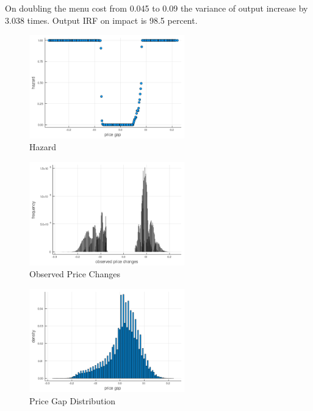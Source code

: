 On doubling the menu cost from 0.045 to 0.09 the variance of output increase by 3.038 times. Output IRF on impact is 98.5 percent.

\begin{figure}
    \centering
    \includegraphics[width = 0.6\textwidth]{../tasks/Golosov_lucas/output/hazard_gl.png}
    \caption{Hazard}
    \label{}
\end{figure}

\begin{figure}
    \centering
    \includegraphics[width = 0.6\textwidth]{../tasks/Golosov_lucas/output/observed_p_changes_gl.png}
    \caption{Observed Price Changes}
    \label{}
\end{figure}

\begin{figure}
    \centering
    \includegraphics[width = 0.6\textwidth]{../tasks/Golosov_lucas/output/price_gap_dist.png}
    \caption{Price Gap Distribution}
    \label{}
\end{figure}
